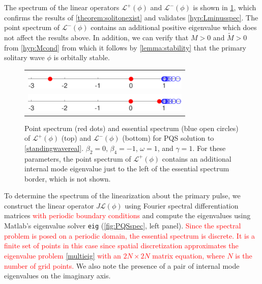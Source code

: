 \documentclass[12pt]{elsarticle}
\def\calL{{\mathcal L}}
\newcommand{\revised}[1]{ \textcolor{red}{#1} }
\begin{document}
The spectrum of the linear operators $\calL^+(\phi)$ and $\calL^-(\phi)$ is shown in \cref{fig:Lpmspec}, which confirms the results of \ref{theorem:solitonexist} and validates \cref{hyp:Lminusspec}. The point spectrum of $\calL^-(\phi)$ contains an additional positive eigenvalue which does not affect the results above. In addition, we can verify that $M > 0$ and $\tilde{M} > 0$ from \cref{hyp:Mcond} from which it follows by \cref{lemma:stability} that the primary solitary wave $\phi$ is orbitally stable.
\begin{figure}[H]
\centering
\begin{tabular}{c}
\includegraphics[width=8cm]{images/Lplusspec.pdf}\\
\includegraphics[width=8cm]{images/Lminusspec.pdf}
\end{tabular}
\caption{Point spectrum (red dots) and essential spectrum (blue open circles) of $\calL^+(\phi)$ (top) and $\calL^-(\phi)$ (bottom) for PQS solution to \cref{standingwavereal}. $\beta_2 = 0$, $\beta_4 = -1$, $\omega = 1$, and $\gamma = 1$. For these parameters, the point spectrum of $\calL^+(\phi)$ contains an additional internal mode eigenvalue just to the left of the essential spectrum border, which is not shown.}
\label{fig:Lpmspec}
\end{figure}  

To determine the spectrum of the linearization about the primary pulse, we construct the linear operator $J \calL(\phi)$ using Fourier spectral differentiation matrices \revised{with periodic boundary conditions} and compute the eigenvalues using Matlab's eigenvalue solver \texttt{eig} (\cref{fig:PQSspec}, left panel). \revised{Since the spectral problem is posed on a periodic domain, the essential spectrum is discrete. It is a finite set of points in this case since spatial discretization approximates the eigenvalue problem \cref{multieig} with an $2N \times 2N$ matrix equation, where $N$ is the number of grid points.} We also note the presence of a pair of internal mode eigenvalues on the imaginary axis.  
\end{document}
